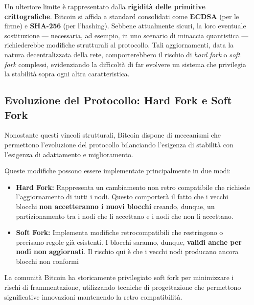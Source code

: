 Un ulteriore limite è rappresentato dalla \textbf{rigidità delle primitive crittografiche}. Bitcoin si affida a standard consolidati come \textbf{ECDSA} (per le firme) e \textbf{SHA-256} (per l'hashing). Sebbene attualmente sicuri, la loro eventuale sostituzione — necessaria, ad esempio, in uno scenario di minaccia quantistica — richiederebbe modifiche strutturali al protocollo. Tali aggiornamenti, data la natura decentralizzata della rete, comporterebbero il rischio di \textit{hard fork} o \textit{soft fork} complessi, evidenziando la difficoltà di far evolvere un sistema che privilegia la stabilità sopra ogni altra caratteristica.

\subsection{Evoluzione del Protocollo: Hard Fork e Soft Fork}
Nonostante questi vincoli strutturali, Bitcoin dispone di meccanismi che permettono l'evoluzione del protocollo bilanciando l'esigenza di stabilità con l'esigenza di adattamento e miglioramento.

Queste modifiche possono essere implementate principalmente in due modi:
\begin{itemize}
    \item \textbf{Hard Fork:} Rappresenta un cambiamento non retro compatibile che richiede l’aggiornamento di tutti i nodi. Questo comporterà il fatto che i vecchi blocchi \textbf{non accetteranno i nuovi blocchi} creando, dunque, un partizionamento tra i nodi che li accettano e i nodi che non li accettano.
    \item \textbf{Soft Fork:} Implementa modifiche retrocompatibili che restringono o precisano regole già esistenti. I blocchi saranno, dunque, \textbf{validi anche per nodi non aggiornati}. Il rischio qui è che i vecchi nodi producano ancora blocchi non conformi
\end{itemize}
La comunità Bitcoin ha storicamente privilegiato soft fork per minimizzare i rischi di frammentazione, utilizzando tecniche di progettazione che permettono significative innovazioni mantenendo la retro compatibilità.

